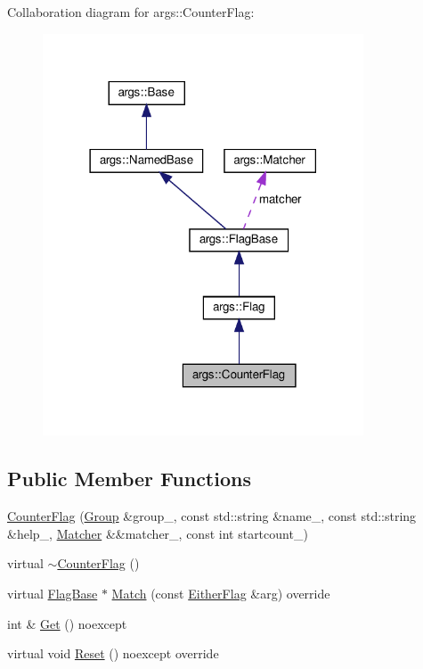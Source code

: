 Collaboration diagram for args\+:\+:Counter\+Flag\+:\nopagebreak
\begin{figure}[H]
\begin{center}
\leavevmode
\includegraphics[width=270pt]{classargs_1_1_counter_flag__coll__graph}
\end{center}
\end{figure}
\subsection*{Public Member Functions}
\begin{DoxyCompactItemize}
\item 
\hyperlink{classargs_1_1_counter_flag_a804bc02152fef801581c150e4271089a}{Counter\+Flag} (\hyperlink{classargs_1_1_group}{Group} \&group\+\_\+, const std\+::string \&name\+\_\+, const std\+::string \&help\+\_\+, \hyperlink{classargs_1_1_matcher}{Matcher} \&\&matcher\+\_\+, const int startcount\+\_)
\item 
virtual \hyperlink{classargs_1_1_counter_flag_a3acc256cd4819c320800c57565d7c2e3}{$\sim$\+Counter\+Flag} ()
\item 
virtual \hyperlink{classargs_1_1_flag_base}{Flag\+Base} $\ast$ \hyperlink{classargs_1_1_counter_flag_ade999a8d89a8fd3db7508dfe7fdf851c}{Match} (const \hyperlink{structargs_1_1_either_flag}{Either\+Flag} \&arg) override
\item 
int \& \hyperlink{classargs_1_1_counter_flag_a74569d67e5fddf37d08614abb0df525c}{Get} () noexcept
\item 
virtual void \hyperlink{classargs_1_1_counter_flag_a408f9c2bf8f3715b89f27f23dfa2a3a5}{Reset} () noexcept override
\end{DoxyCompactItemize}
